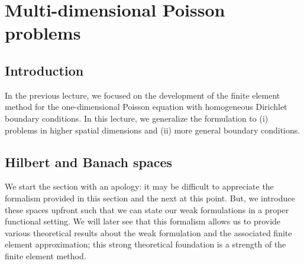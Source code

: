 \chapter{Multi-dimensional Poisson problems}

\disclaimer

\section{Introduction}
In the previous lecture, we focused on the development of the finite element method for the one-dimensional Poisson equation with homogeneous Dirichlet boundary conditions. In this lecture, we generalize the formulation to (i) problems in higher spatial dimensions and (ii) more general boundary conditions.  

\section{Hilbert and Banach spaces}
We start the section with an apology: it may be difficult to appreciate the formalism provided in this section and the next at this point.  But, we introduce these spaces upfront such that we can state our weak formulations in a proper functional setting.  We will later see that this formalism allows us to provide various theoretical results about the weak formulation and the associated finite element approximation; this strong theoretical foundation is a strength of the finite element method. 

